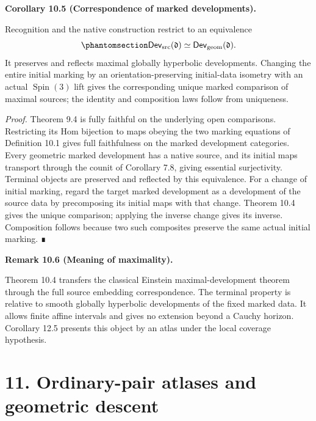 \documentclass[
  english,
  11pt,
  reqno]{amsart}
\makeatletter
\newcommand{\pandocstatementheading}[1]{%
  \par\if@nobreak\else
    \addpenalty{\@beginparpenalty}%
    \addvspace{.5\baselineskip plus .2\baselineskip minus .2\baselineskip}%
  \fi
  {\normalfont\bfseries #1\par}%
  \nobreak\@afterindenttrue\@afterheading
}
\makeatother
\begin{document}
\pandocstatementheading{\protect{}\label{cor:global-marked-development-correspondence}Corollary 10.5 (Correspondence of marked developments).}

Recognition and the native construction restrict to an equivalence
\begin{equation}\protect\phantomsection\label{eq:global-marked-development-equivalence}{
\mathsf{Dev}_{\mathrm{src}}(\mathfrak d)
\simeq
\mathsf{Dev}_{\mathrm{geom}}(\mathfrak d).
}\end{equation} It preserves and reflects maximal globally hyperbolic
developments. Changing the entire initial marking by an
orientation-preserving initial-data isometry with an actual
\(\operatorname{Spin}(3)\) lift gives the corresponding unique marked
comparison of maximal sources; the identity and composition laws follow
from uniqueness.

\emph{Proof.} Theorem 9.4 is fully faithful on the underlying open
comparisons. Restricting its Hom bijection to maps obeying the two
marking equations of Definition 10.1 gives full faithfulness on the
marked development categories. Every geometric marked development has a
native source, and its initial maps transport through the counit of
Corollary 7.8, giving essential surjectivity. Terminal objects are
preserved and reflected by this equivalence. For a change of initial
marking, regard the target marked development as a development of the
source data by precomposing its initial maps with that change. Theorem
10.4 gives the unique comparison; applying the inverse change gives its
inverse. Composition follows because two such composites preserve the
same actual initial marking. ∎

\pandocstatementheading{\protect{}\label{rem:global-maximal-source-scope}Remark 10.6 (Meaning of maximality).}

Theorem 10.4 transfers the classical Einstein maximal-development
theorem through the full source embedding correspondence. The terminal
property is relative to smooth globally hyperbolic developments of the
fixed marked data. It allows finite affine intervals and gives no
extension beyond a Cauchy horizon. Corollary 12.5 presents this object
by an atlas under the local coverage hypothesis.

\protect{}\label{sec:global-ordinary-pair-atlases}

\section{11. Ordinary-pair atlases and geometric
descent}\label{ordinary-pair-atlases-and-geometric-descent}
\end{document}
